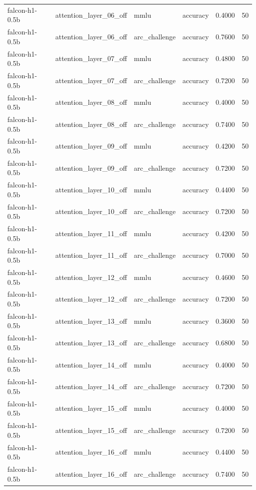 \begin{tabular}{llllrr}
falcon-h1-0.5b & attention_layer_06_off & mmlu & accuracy & 0.4000 & 50 \\
falcon-h1-0.5b & attention_layer_06_off & arc_challenge & accuracy & 0.7600 & 50 \\
falcon-h1-0.5b & attention_layer_07_off & mmlu & accuracy & 0.4800 & 50 \\
falcon-h1-0.5b & attention_layer_07_off & arc_challenge & accuracy & 0.7200 & 50 \\
falcon-h1-0.5b & attention_layer_08_off & mmlu & accuracy & 0.4000 & 50 \\
falcon-h1-0.5b & attention_layer_08_off & arc_challenge & accuracy & 0.7400 & 50 \\
falcon-h1-0.5b & attention_layer_09_off & mmlu & accuracy & 0.4200 & 50 \\
falcon-h1-0.5b & attention_layer_09_off & arc_challenge & accuracy & 0.7200 & 50 \\
falcon-h1-0.5b & attention_layer_10_off & mmlu & accuracy & 0.4400 & 50 \\
falcon-h1-0.5b & attention_layer_10_off & arc_challenge & accuracy & 0.7200 & 50 \\
falcon-h1-0.5b & attention_layer_11_off & mmlu & accuracy & 0.4200 & 50 \\
falcon-h1-0.5b & attention_layer_11_off & arc_challenge & accuracy & 0.7000 & 50 \\
falcon-h1-0.5b & attention_layer_12_off & mmlu & accuracy & 0.4600 & 50 \\
falcon-h1-0.5b & attention_layer_12_off & arc_challenge & accuracy & 0.7200 & 50 \\
falcon-h1-0.5b & attention_layer_13_off & mmlu & accuracy & 0.3600 & 50 \\
falcon-h1-0.5b & attention_layer_13_off & arc_challenge & accuracy & 0.6800 & 50 \\
falcon-h1-0.5b & attention_layer_14_off & mmlu & accuracy & 0.4000 & 50 \\
falcon-h1-0.5b & attention_layer_14_off & arc_challenge & accuracy & 0.7200 & 50 \\
falcon-h1-0.5b & attention_layer_15_off & mmlu & accuracy & 0.4000 & 50 \\
falcon-h1-0.5b & attention_layer_15_off & arc_challenge & accuracy & 0.7200 & 50 \\
falcon-h1-0.5b & attention_layer_16_off & mmlu & accuracy & 0.4400 & 50 \\
falcon-h1-0.5b & attention_layer_16_off & arc_challenge & accuracy & 0.7400 & 50 \\

\end{tabular}
